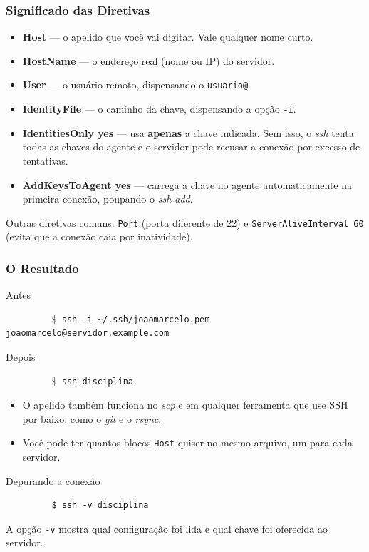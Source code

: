 \documentclass{beamer}
\begin{document}
\begin{frame}[fragile]
   \frametitle{Significado das Diretivas}
   \begin{itemize}
      \item \textbf{Host} --- o apelido que você vai digitar. Vale qualquer nome curto.
      \item \textbf{HostName} --- o endereço real (nome ou IP) do servidor.
      \item \textbf{User} --- o usuário remoto, dispensando o \texttt{usuario@}.
      \item \textbf{IdentityFile} --- o caminho da chave, dispensando a opção \texttt{-i}.
      \item \textbf{IdentitiesOnly yes} --- usa \textbf{apenas} a chave indicada. Sem isso, o \textit{ssh} tenta todas as chaves do agente e o servidor pode recusar a conexão por excesso de tentativas.
      \item \textbf{AddKeysToAgent yes} --- carrega a chave no agente automaticamente na primeira conexão, poupando o \textit{ssh-add}.
   \end{itemize}
   Outras diretivas comuns: \texttt{Port} (porta diferente de 22) e \texttt{ServerAliveInterval 60} (evita que a conexão caia por inatividade).
\end{frame}

\begin{frame}[fragile]
   \frametitle{O Resultado}
   \begin{block}{Antes}
      \begin{verbatim}
         $ ssh -i ~/.ssh/joaomarcelo.pem joaomarcelo@servidor.example.com
      \end{verbatim}
   \end{block}
   \begin{block}{Depois}
      \begin{verbatim}
         $ ssh disciplina
      \end{verbatim}
   \end{block}
   \begin{itemize}
      \item O apelido também funciona no \textit{scp} e em qualquer ferramenta que use SSH por baixo, como o \textit{git} e o \textit{rsync}.
      \item Você pode ter quantos blocos \texttt{Host} quiser no mesmo arquivo, um para cada servidor.
   \end{itemize}
   \begin{block}{Depurando a conexão}
      \begin{verbatim}
         $ ssh -v disciplina
      \end{verbatim}
   \end{block}
   A opção \texttt{-v} mostra qual configuração foi lida e qual chave foi oferecida ao servidor.
\end{frame}
\end{document}
